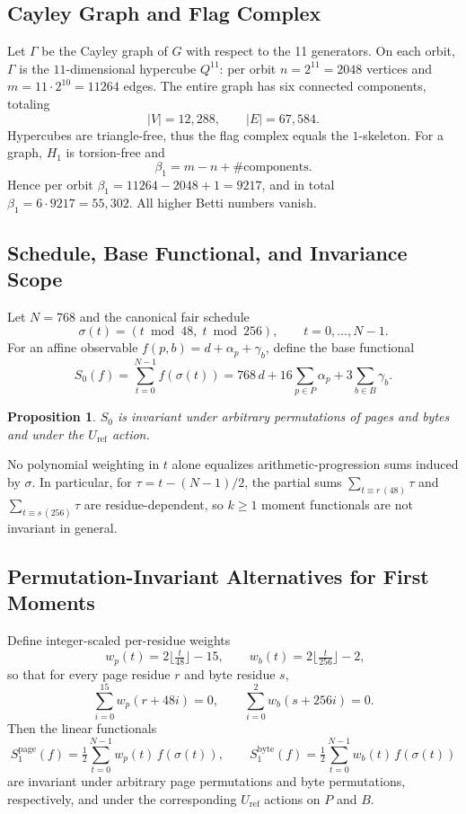 \documentclass[12pt]{article}
\newtheorem{proposition}[theorem]{Proposition}
\begin{document}
\subsection{Cayley Graph and Flag Complex}
Let $\Gamma$ be the Cayley graph of $G$ with respect to the 11 generators. On each orbit, $\Gamma$ is the $11$-dimensional hypercube $Q^{11}$: per orbit $n=2^{11}=2048$ vertices and $m=11\cdot 2^{10}=11264$ edges. The entire graph has six connected components, totaling
\[
|V|=12{,}288,\qquad |E|=67{,}584.
\]
Hypercubes are triangle-free, thus the flag complex equals the $1$-skeleton. For a graph, $H_1$ is torsion-free and
\[
\beta_1 = m-n+\#\text{components}.
\]
Hence per orbit $\beta_1=11264-2048+1=9217$, and in total $\beta_1=6\cdot 9217=55{,}302$. All higher Betti numbers vanish.

\subsection{Schedule, Base Functional, and Invariance Scope}
Let $N=768$ and the canonical fair schedule
\[
\sigma(t)=(t\bmod 48,\; t\bmod 256),\qquad t=0,\dots,N-1.
\]
For an affine observable $f(p,b)=d+\alpha_p+\gamma_b$, define the base functional
\[
S_0(f)=\sum_{t=0}^{N-1} f(\sigma(t))=768\,d+16\sum_{p\in P}\!\alpha_p+3\sum_{b\in B}\!\gamma_b.
\]
\begin{proposition}
$S_0$ is invariant under arbitrary permutations of pages and bytes and under the $U_{\mathrm{ref}}$ action.
\end{proposition}
\begin{remark}
No polynomial weighting in $t$ alone equalizes arithmetic-progression sums induced by $\sigma$. In particular, for $\tau=t-(N-1)/2$, the partial sums $\sum_{t\equiv r\,(48)}\!\tau$ and $\sum_{t\equiv s\,(256)}\!\tau$ are residue-dependent, so $k\ge 1$ moment functionals are not invariant in general.
\end{remark}

\subsection{Permutation-Invariant Alternatives for First Moments}
Define integer-scaled per-residue weights
\[
\,\, w_p(t)=2\Big\lfloor\tfrac{t}{48}\Big\rfloor-15,\qquad w_b(t)=2\Big\lfloor\tfrac{t}{256}\Big\rfloor-2,
\]
so that for every page residue $r$ and byte residue $s$,
\[
\sum_{i=0}^{15} w_p(r+48i)=0,\qquad \sum_{i=0}^{2} w_b(s+256i)=0.
\]
Then the linear functionals
\[
S^{\mathrm{page}}_1(f)=\tfrac{1}{2}\sum_{t=0}^{N-1} w_p(t)\, f(\sigma(t)),\qquad
S^{\mathrm{byte}}_1(f)=\tfrac{1}{2}\sum_{t=0}^{N-1} w_b(t)\, f(\sigma(t))
\]
are invariant under arbitrary page permutations and byte permutations, respectively, and under the corresponding $U_{\mathrm{ref}}$ actions on $P$ and $B$.
\end{document}
